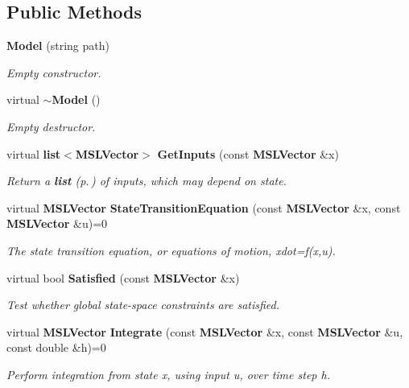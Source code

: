 \subsection*{Public Methods}
\begin{CompactItemize}
\item 
{\bf Model} (string path)
\begin{CompactList}\small\item\em Empty constructor.\item\end{CompactList}\item 
virtual {\bf $\sim$Model} ()
\begin{CompactList}\small\item\em Empty destructor.\item\end{CompactList}\item 
virtual {\bf list}$<${\bf MSLVector}$>$ {\bf Get\-Inputs} (const {\bf MSLVector} \&x)
\begin{CompactList}\small\item\em Return a {\bf list} {\rm (p.\,\pageref{classlist})} of inputs, which may depend on state.\item\end{CompactList}\item 
virtual {\bf MSLVector} {\bf State\-Transition\-Equation} (const {\bf MSLVector} \&x, const {\bf MSLVector} \&u)=0
\begin{CompactList}\small\item\em The state transition equation, or equations of motion, xdot=f(x,u).\item\end{CompactList}\item 
virtual bool {\bf Satisfied} (const {\bf MSLVector} \&x)
\begin{CompactList}\small\item\em Test whether global state-space constraints are satisfied.\item\end{CompactList}\item 
virtual {\bf MSLVector} {\bf Integrate} (const {\bf MSLVector} \&x, const {\bf MSLVector} \&u, const double \&h)=0
\begin{CompactList}\small\item\em Perform integration from state x, using input u, over time step h.\item\end{CompactList}\item 

\end{CompactItemize}
